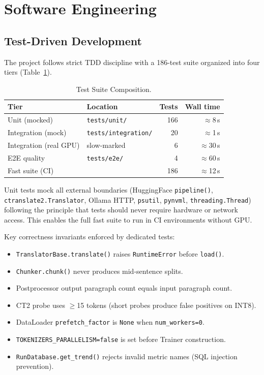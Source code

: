 \documentclass[conference]{IEEEtran}
\begin{document}
\section{Software Engineering}

\subsection{Test-Driven Development}

The project follows strict TDD discipline with a 186-test suite organized into
four tiers (Table~\ref{tab:tests}).

\begin{table}[htbp]
\caption{Test Suite Composition.}
\label{tab:tests}
\centering
\begin{tabular}{llrr}
\toprule
Tier & Location & Tests & Wall time \\
\midrule
Unit (mocked) & \texttt{tests/unit/} & 166 & $\approx$8\,s \\
Integration (mock) & \texttt{tests/integration/} & 20 & $\approx$1\,s \\
Integration (real GPU) & slow-marked & 6 & $\approx$30\,s \\
E2E quality & \texttt{tests/e2e/} & 4 & $\approx$60\,s \\
\midrule
Fast suite (CI) & & 186 & $\approx$12\,s \\
\bottomrule
\end{tabular}
\end{table}

Unit tests mock all external boundaries (HuggingFace \texttt{pipeline()},
\texttt{ctranslate2.Translator}, Ollama HTTP, \texttt{psutil}, \texttt{pynvml},
\texttt{threading.Thread}) following the principle that tests should never require
hardware or network access. This enables the full fast suite to run in CI
environments without GPU.

Key correctness invariants enforced by dedicated tests:
\begin{itemize}
  \item \texttt{TranslatorBase.translate()} raises \texttt{RuntimeError} before \texttt{load()}.
  \item \texttt{Chunker.chunk()} never produces mid-sentence splits.
  \item Postprocessor output paragraph count equals input paragraph count.
  \item CT2 probe uses $\geq$15 tokens (short probes produce false positives on INT8).
  \item DataLoader \texttt{prefetch\_factor} is \texttt{None} when \texttt{num\_workers=0}.
  \item \texttt{TOKENIZERS\_PARALLELISM=false} is set before Trainer construction.
  \item \texttt{RunDatabase.get\_trend()} rejects invalid metric names (SQL injection prevention).
\end{itemize}
\end{document}
